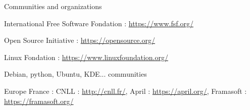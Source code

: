 \documentclass{beamer}
\begin{document}
\begin{frame}[plain]%
%  
\end{frame}


\begin{frame}[plain]%
%  
\end{frame}

\begin{frame}[plain]%
%  
\end{frame}

\begin{frame}{Communities and organizations}

  \begin{block}{International}
    Free Software Fondation : \url{https://www.fsf.org/}

    Open Source Initiative : \url{https://opensource.org/}

    Linux Fondation : \url{https://www.linuxfoundation.org/}

    Debian, python, Ubuntu, KDE... communities
  \end{block}

\pause

  \begin{block}{Europe}
    France : CNLL : \url{http://cnll.fr/}, April : \url{https://april.org/}, Framasoft : \url{https://framasoft.org/}

    
  \end{block}
\end{frame}
\end{document}
